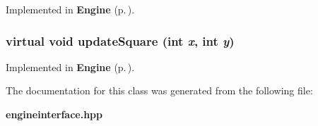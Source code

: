 Implemented in {\bf Engine} {\rm (p.\,\pageref{classEngine_a5})}.
\subsubsection{\setlength{\rightskip}{0pt plus 5cm}virtual void update\-Square (int {\em x}, int {\em y})\hspace{0.3cm}{\tt  [pure virtual]}}\label{classEngineInterface_a4}




Implemented in {\bf Engine} {\rm (p.\,\pageref{classEngine_a6})}.

The documentation for this class was generated from the following file:\begin{CompactItemize}
\item 
{\bf engineinterface.hpp}\end{CompactItemize}
